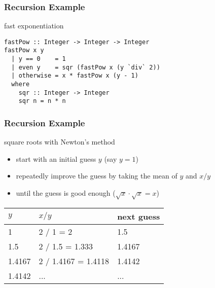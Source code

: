 \documentclass[dvipsnames]{beamer}
\theoremstyle{plain}
\begin{document}
\begin{frame}[fragile]
  \frametitle{Recursion Example}

  \begin{exampleblock}{fast exponentiation}
    \begin{lstlisting}
fastPow :: Integer -> Integer -> Integer
fastPow x y
  | y == 0    = 1
  | even y    = sqr (fastPow x (y `div` 2))
  | otherwise = x * fastPow x (y - 1)
  where
    sqr :: Integer -> Integer
    sqr n = n * n
    \end{lstlisting}
  \end{exampleblock}
\end{frame}

\begin{frame}
  \frametitle{Recursion Example}

  \begin{exampleblock}{square roots with Newton's method}
    \begin{itemize}
      \item start with an initial guess $y$ (say $y = 1$)
      \item repeatedly improve the guess by taking the mean of $y$
        and $x / y$
      \item until the guess is good enough ($\sqrt x \cdot \sqrt x = x$)
    \end{itemize}

    \medskip
    \begin{center}
      \begin{tabular}{lll}
      $y$      & $x / y$             & next guess\\\hline
      1        & 2 / 1 = 2           & 1.5\\
      1.5      & 2 / 1.5 = 1.333     & 1.4167\\
      1.4167   & 2 / 1.4167 = 1.4118 & 1.4142\\
      1.4142   & ...                 & ...
      \end{tabular}
    \end{center}
  \end{exampleblock}
\end{frame}
\end{document}
